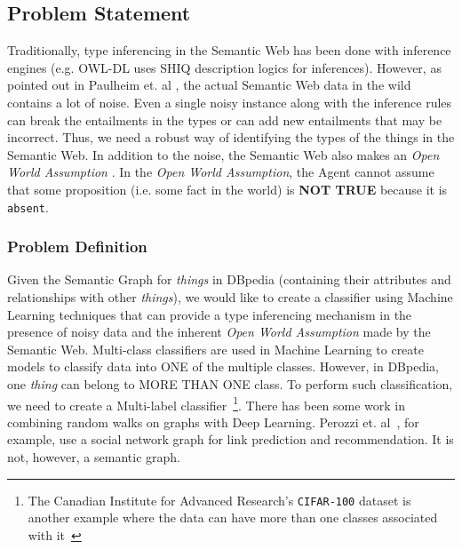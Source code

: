 \documentclass[runningheads,a4paper]{IEEEtran}
\begin{document}
\vspace{-10pt}
\subsection{Problem Statement}
\label{problemStatement}
Traditionally, type inferencing in the Semantic Web has been done with inference engines (e.g. OWL-DL uses SHIQ description logics \cite{horrocks2003shiq} for inferences). However, as pointed out in Paulheim et. al \cite{paulheim2013type}, the actual Semantic Web data in the wild contains a lot of noise. Even a single noisy instance along with the inference rules can break the entailments in the types or can add new entailments that may be incorrect. Thus, we need a robust way of identifying the types of the things in the Semantic Web.  
In addition to the noise, the Semantic Web also makes an \textit{Open World Assumption} \cite{drummond2006open}. In the \textit{Open World Assumption}, the Agent cannot assume that some proposition (i.e. some fact in the world) is \textbf{NOT TRUE} because it is \texttt{absent}. 

\subsubsection{Problem Definition}
Given the Semantic Graph for \textit{things} in DBpedia (containing their attributes and relationships with other \textit{things}), we would like to create a classifier using Machine Learning techniques that can provide a type inferencing mechanism in the presence of noisy data and the inherent \textit{Open World Assumption} made by the Semantic Web. Multi-class classifiers are used in Machine Learning to create models to classify data into ONE of the multiple classes. However, in DBpedia, one \textit{thing} can belong to MORE THAN ONE class. To perform such classification, we need to create a Multi-label classifier~\cite{tsoumakas2006multi}\footnote{The Canadian Institute for Advanced Research's \texttt{CIFAR-100} dataset is another example where the data can have more than one classes associated with it~\cite{krizhevsky2009learning}}. There has been some work in combining random walks on graphs with Deep Learning. Perozzi et. al~\cite{perozzi2014deepwalk}, for example, use a social network graph for link prediction and recommendation.  It is not, however, a semantic graph.
\end{document}
